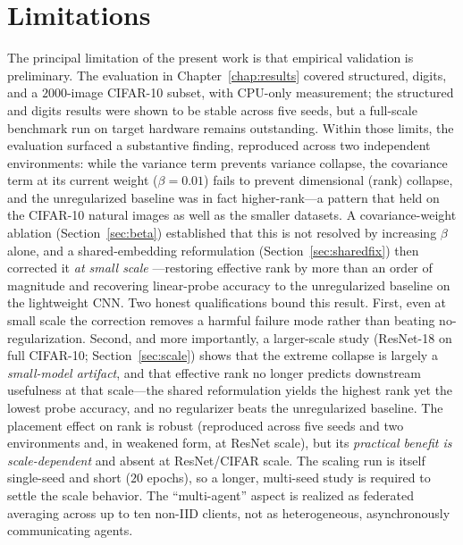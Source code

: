 \section{Limitations}
The principal limitation of the present work is that empirical validation
is preliminary. The evaluation in Chapter~\ref{chap:results} covered
structured, digits, and a $2000$-image CIFAR-10 subset, with CPU-only
measurement; the structured and digits results were shown to be stable across
five seeds, but a full-scale benchmark run on target hardware remains
outstanding. Within those limits, the evaluation surfaced a substantive
finding, reproduced across two independent environments: while the variance
term prevents variance collapse, the covariance term at its current weight
($\beta = 0.01$) fails to prevent dimensional (rank) collapse, and the
unregularized baseline was in fact higher-rank---a pattern that held on the
CIFAR-10 natural images as well as the smaller datasets. A covariance-weight
ablation (Section~\ref{sec:beta}) established that this is not resolved by
increasing $\beta$ alone, and a shared-embedding reformulation
(Section~\ref{sec:sharedfix}) then corrected it \emph{at small scale}%
---restoring effective rank by more than an order of magnitude and recovering
linear-probe accuracy to the unregularized baseline on the lightweight CNN.
Two honest qualifications bound this result. First, even at small scale the
correction removes a harmful failure mode rather than beating no-regularization.
Second, and more importantly, a larger-scale study (ResNet-18 on full CIFAR-10;
Section~\ref{sec:scale}) shows that the extreme collapse is largely a
\emph{small-model artifact}, and that effective rank no longer predicts
downstream usefulness at that scale---the shared reformulation yields the
highest rank yet the lowest probe accuracy, and no regularizer beats the
unregularized baseline. The placement effect on rank is robust (reproduced
across five seeds and two environments and, in weakened form, at ResNet scale),
but its \emph{practical benefit is scale-dependent} and absent at ResNet/CIFAR
scale. The scaling run is itself single-seed and short ($20$ epochs), so a
longer, multi-seed study is required to settle the scale behavior. The
``multi-agent'' aspect is realized as federated averaging across up to ten
non-IID clients, not as heterogeneous, asynchronously communicating agents.

